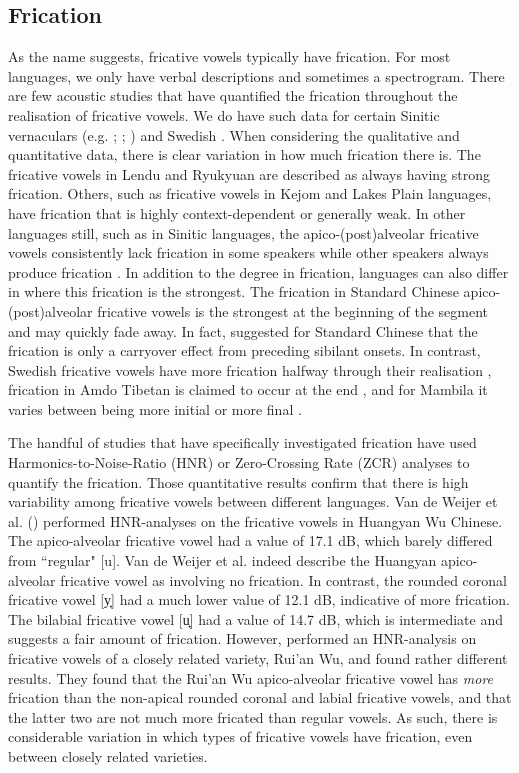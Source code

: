 \documentclass[output=paper,colorlinks,citecolor=brown,chinesefont]{langscibook}
\begin{document}
\subsection{Frication}
As the name suggests, fricative vowels typically have frication. For most languages, we only have verbal descriptions and sometimes a spectrogram. There are few acoustic studies that have quantified the frication throughout the realisation of fricative vowels. We do have such data for certain Sinitic vernaculars (e.g. \cite{Hu&He_2019}; \cite{shao_2020}; \cite{VandeWeijer&al_2021}) and Swedish \citep{westerberg_2020}. When considering the qualitative and quantitative data, there is clear variation in how much frication there is. The fricative vowels in Lendu and Ryukyuan are described as always having strong frication. Others, such as fricative vowels in Kejom and Lakes Plain languages, have frication that is highly context-dependent or generally weak. In other languages still, such as in Sinitic languages, the apico-(post)alveolar fricative vowels consistently lack frication in some speakers while other speakers always produce frication \citep{faytak&lin_2015}. In addition to the degree in frication, languages can also differ in where this frication is the strongest. The frication in Standard Chinese apico-(post)alveolar fricative vowels is the strongest at the beginning of the segment and may quickly fade away. In fact, \citet{Lee-Kim_2014} suggested for Standard Chinese that the frication is only a carryover effect from preceding sibilant onsets. In contrast, Swedish fricative vowels have more frication halfway through their realisation \citep{westerberg_2020}, frication in Amdo Tibetan is claimed to occur at the end \citep{Janhunen&Norbu_2014}, and for Mambila it varies between being more initial or more final \citep{connell_2007}.

The handful of studies that have specifically investigated frication have used Harmonics-to-Noise-Ratio (HNR) or Zero-Crossing Rate (ZCR) analyses to quantify the frication. Those quantitative results confirm that there is high variability among fricative vowels between different languages. Van de Weijer et al. (\citeyear{VandeWeijer&al_2021}) performed HNR-analyses on the fricative vowels in Huangyan Wu Chinese. The apico-alveolar fricative vowel had a value of 17.1 dB, which barely differed from ``regular" [u]. Van de Weijer et al. indeed describe the Huangyan apico-alveolar fricative vowel as involving no frication. In contrast, the rounded coronal fricative vowel [y̟] had a much lower value of 12.1 dB, indicative of more frication. The bilabial fricative vowel [u̟] had a value of 14.7 dB, which is intermediate and suggests a fair amount of frication. However, \citet{Hu&He_2019} performed an HNR-analysis on fricative vowels of a closely related variety, Rui'an Wu, and found rather different results. They found that the Rui'an Wu apico-alveolar fricative vowel has \textit{more} frication than the non-apical rounded coronal and labial fricative vowels, and that the latter two are not much more fricated than regular vowels. As such, there is considerable variation in which types of fricative vowels have frication, even between closely related varieties.
\end{document}
